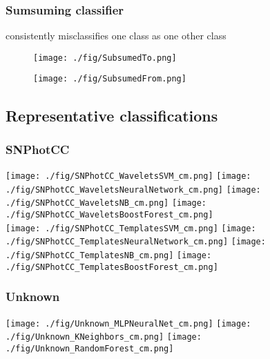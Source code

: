 \subsubsection{Sumsuming classifier}
\label{sec:subsume_data}

consistently misclassifies one class as one other class

\begin{figure}
	\begin{center}
		\texttt{[image: ./fig/SubsumedTo.png]}\\
		\caption{}
		\label{fig:subsumer_data}
	\end{center}
\end{figure}

\begin{figure}
	\begin{center}
		\texttt{[image: ./fig/SubsumedFrom.png]}\\
		\caption{}
		\label{fig:subsumee_data}
	\end{center}
\end{figure}

\subsection{Representative classifications}
\label{sec:realdata}

\subsubsection{SNPhotCC}
\label{sec:snphotcc}

\begin{figure*}
	\begin{center}
		\texttt{[image: ./fig/SNPhotCC\_WaveletsSVM\_cm.png]}
		\texttt{[image: ./fig/SNPhotCC\_WaveletsNeuralNetwork\_cm.png]}
		\texttt{[image: ./fig/SNPhotCC\_WaveletsNB\_cm.png]}
		\texttt{[image: ./fig/SNPhotCC\_WaveletsBoostForest\_cm.png]}\\
		\texttt{[image: ./fig/SNPhotCC\_TemplatesSVM\_cm.png]}
		\texttt{[image: ./fig/SNPhotCC\_TemplatesNeuralNetwork\_cm.png]}
		\texttt{[image: ./fig/SNPhotCC\_TemplatesNB\_cm.png]}
		\texttt{[image: ./fig/SNPhotCC\_TemplatesBoostForest\_cm.png]}
		\caption{}
		\label{fig:snphotcc_cm}
	\end{center}
\end{figure*}

\subsubsection{Unknown}
\label{sec:mystery}

\begin{figure*}
	\begin{center}
		\texttt{[image: ./fig/Unknown\_MLPNeuralNet\_cm.png]}
		\texttt{[image: ./fig/Unknown\_KNeighbors\_cm.png]}
		\texttt{[image: ./fig/Unknown\_RandomForest\_cm.png]}
		\caption{}
		\label{fig:unknown_cm}
	\end{center}
\end{figure*}
